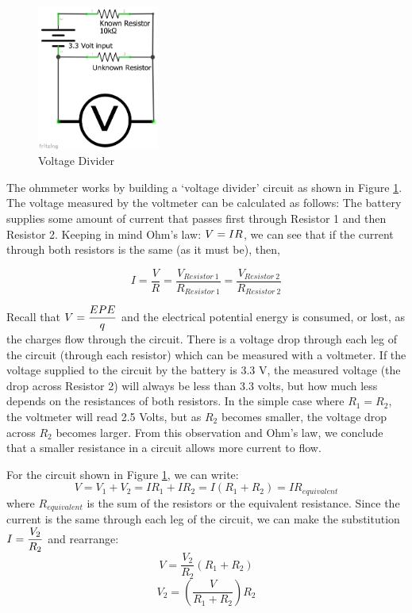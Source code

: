 \documentclass[]{article}
\begin{document}
	\begin{figure}%
		\centering
		\includegraphics[width=4cm]{pics/voltagedivider.png}
		\caption{Voltage Divider}
		\label{divider}
	\end{figure}

	The ohmmeter works by building a `voltage divider' circuit as shown in Figure \ref{divider}.  The voltage measured by the voltmeter can be calculated as follows:  The battery supplies  some amount of current that passes first through Resistor 1 and then Resistor 2.  Keeping in mind Ohm's law: $\displaystyle V=IR$, we can see that if the current through both resistors is the same (as it must be), then,

	\begin{equation}
		I = \frac{V}{R} = \frac{V_{Resistor\ 1}}{R_{Resistor\ 1}} = \frac{V_{Resistor\ 2}}{R_{Resistor\ 2}} 
	\end{equation}

	Recall that $\displaystyle V = \frac{EPE}{q}$ and the electrical potential energy is consumed, or lost, as the charges flow through the circuit.  There is a voltage drop through each leg of the circuit (through each resistor) which can be measured with a voltmeter. If the voltage supplied to the circuit by the battery is 3.3 V, the  measured voltage (the drop across Resistor 2) will always be less than 3.3 volts, but how much less depends on the resistances of both resistors.  In the simple case where $R_1 = R_2$, the voltmeter will read 2.5 Volts, but as $R_2$ becomes smaller, the voltage drop across \(R_2\) becomes larger.  From this observation and Ohm's law, we conclude that a smaller resistance in a circuit allows more current to flow. 

  	For the circuit shown in Figure \ref{divider}, we can write:
	\begin{equation}
		V= V_1 + V_2 = IR_1 + IR_2 = I(R_1 +R_2) = IR_{equivalent}
	\end{equation}
	where $R_{equivalent}$ is the sum of the resistors or the equivalent resistance.  Since the current is the same through each leg of the circuit, we can make the substitution $\displaystyle I = \frac{V_2}{R_2}$ and rearrange:
	\begin{equation}
		V=\frac{V_2}{R_2}(R_1 +R_2)
		\label{voltage}
	\end{equation}
	\begin{equation}
		V_2=\left(\frac{V}{R_1+R_2}\right)R_2
		\label{VDiv}
	\end{equation}
\end{document}
